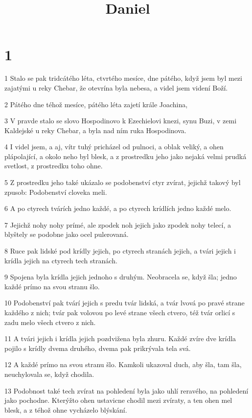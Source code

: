 

\title{Daniel}

\chapter{1}

\par 1 Stalo se pak tridcátého léta, ctvrtého mesíce, dne pátého, když jsem byl mezi zajatými u reky Chebar, že otevrína byla nebesa, a videl jsem videní Boží.
\par 2 Pátého dne téhož mesíce, pátého léta zajetí krále Joachina,
\par 3 V pravde stalo se slovo Hospodinovo k Ezechielovi knezi, synu Buzi, v zemi Kaldejské u reky Chebar, a byla nad ním ruka Hospodinova.
\par 4 I videl jsem, a aj, vítr tuhý pricházel od pulnoci, a oblak veliký, a ohen plápolající, a okolo neho byl blesk, a z prostredku jeho jako nejaká velmi prudká svetlost, z prostredku toho ohne.
\par 5 Z prostredku jeho také ukázalo se podobenství ctyr zvírat, jejichž takový byl zpusob: Podobenství cloveka meli.
\par 6 A po ctyrech tvárích jedno každé, a po ctyrech krídlích jedno každé melo.
\par 7 Jejichž nohy nohy prímé, ale zpodek noh jejich jako zpodek nohy telecí, a blyštely se podobne jako ocel pulerovaná.
\par 8 Ruce pak lidské pod krídly jejich, po ctyrech stranách jejich, a tvári jejich i krídla jejich na ctyrech tech stranách.
\par 9 Spojena byla krídla jejich jednoho s druhým. Neobracela se, když šla; jedno každé prímo na svou stranu šlo.
\par 10 Podobenství pak tvárí jejich s predu tvár lidská, a tvár lvová po pravé strane každého z nich; tvár pak volovou po levé strane všech ctvero, též tvár orlicí s zadu melo všech ctvero z nich.
\par 11 A tvári jejich i krídla jejich pozdvižena byla zhuru. Každé zvíre dve krídla pojilo s krídly dvema druhého, dvema pak prikrývala tela svá.
\par 12 A každé prímo na svou stranu šlo. Kamkoli ukazoval duch, aby šla, tam šla, neuchylovala se, když chodila.
\par 13 Podobnost také tech zvírat na pohledení byla jako uhlí reravého, na pohledení jako pochodne. Kterýžto ohen ustavicne chodil mezi zvíraty, a ten ohen mel blesk, a z téhož ohne vycházelo blýskání.

